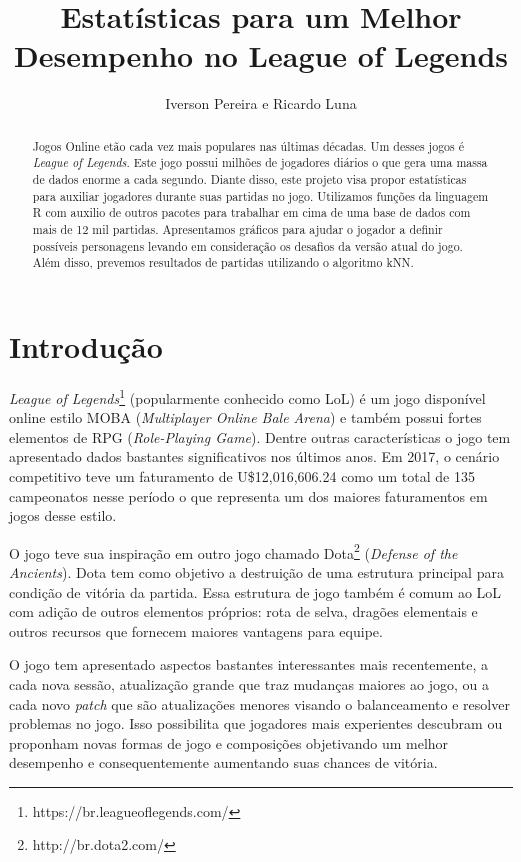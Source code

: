 \documentclass[a4paper]{article}
\title{Estatísticas para um Melhor Desempenho no League of Legends}
\author{Iverson Pereira e Ricardo Luna}
\begin{document}
\maketitle

\begin{abstract}
Jogos Online etão cada vez mais populares nas últimas décadas. Um desses jogos é \textit{League of Legends}. Este jogo possui milhões de jogadores diários o que gera uma massa de dados enorme a cada segundo. Diante disso, este projeto visa propor estatísticas para auxiliar jogadores durante suas partidas no jogo. Utilizamos funções da linguagem R com auxilio de outros pacotes para trabalhar em cima de uma base de dados com mais de 12 mil partidas. Apresentamos gráficos para ajudar o jogador a definir possíveis personagens levando em consideração os desafios da versão atual do jogo. Além disso, prevemos resultados de partidas utilizando o algoritmo kNN.
\end{abstract}

\section{Introdução}

\textit{League of Legends}\footnote{https://br.leagueoflegends.com/} (popularmente conhecido como LoL) é um jogo disponível online estilo MOBA (\textit{Multiplayer Online Bale Arena}) e também possui fortes elementos de RPG (\textit{Role-Playing Game}). Dentre outras características o jogo tem apresentado dados bastantes significativos nos últimos anos. Em 2017, o cenário competitivo teve um faturamento de U\$12,016,606.24 como um total de 135 campeonatos nesse período o que representa um dos maiores faturamentos em jogos desse estilo.  

O jogo teve sua inspiração em outro jogo chamado Dota\footnote{http://br.dota2.com/} (\textit{Defense of the Ancients}). Dota tem como objetivo a destruição de uma estrutura principal para condição de vitória da partida. Essa estrutura de jogo também é comum ao LoL com adição de outros elementos próprios: rota de selva, dragões elementais e outros recursos que fornecem maiores vantagens para equipe.  

O jogo tem apresentado aspectos bastantes interessantes mais recentemente, a cada nova sessão, atualização grande que traz mudanças maiores ao jogo, ou a cada novo \textit{patch} que são atualizações menores visando o balanceamento e resolver problemas no jogo. Isso possibilita que jogadores mais experientes descubram ou proponham novas formas de jogo e composições objetivando um melhor desempenho e consequentemente aumentando suas chances de vitória. 
\end{document}
